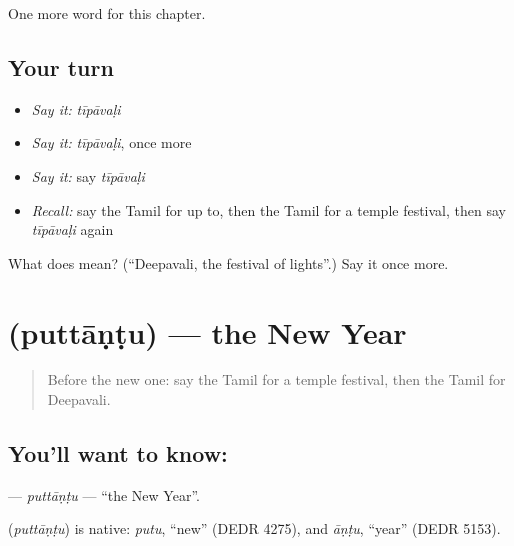 \begin{grammarlens}[title={What you've built}]
One more word for this chapter.
\end{grammarlens}

\subsection*{Your turn}
\begin{itemize}
\raggedright
  \item \emph{Say it:} \emph{tīpāvaḷi}
  \item \emph{Say it:} \emph{tīpāvaḷi}, once more
  \item \emph{Say it:} say \emph{tīpāvaḷi}
  \item \emph{Recall:} say the Tamil for up to, then the Tamil for a temple festival, then say \emph{tīpāvaḷi} again
\end{itemize}

\begin{tcolorbox}[breakable,colback=teal!4,colframe=teal!35!black,title={Before you move on}]
What does  mean? (\textquotedblleft{}Deepavali, the festival of lights\textquotedblright{}.) Say it once more.
\end{tcolorbox}
\section[\texorpdfstring{\ta{புத்தாண்டு} (puttāṇṭu)}{புத்தாண்டு (puttāṇṭu)}]{ (puttāṇṭu) — the New Year}

\label{lesson:TA-C202-puttantu}



\begin{quote}
Before the new one: say the Tamil for a temple festival, then the Tamil for Deepavali.
\end{quote}

\subsection*{You'll want to know: }
\textbf{} — \emph{puttāṇṭu} — \textquotedblleft{}the New Year\textquotedblright{}.

\begin{cousinweb}
\textbf{} (\emph{puttāṇṭu}) is native: \emph{putu}, \textquotedblleft{}new\textquotedblright{} (DEDR 4275), and \emph{āṇṭu}, \textquotedblleft{}year\textquotedblright{} (DEDR 5153).
\end{cousinweb}

